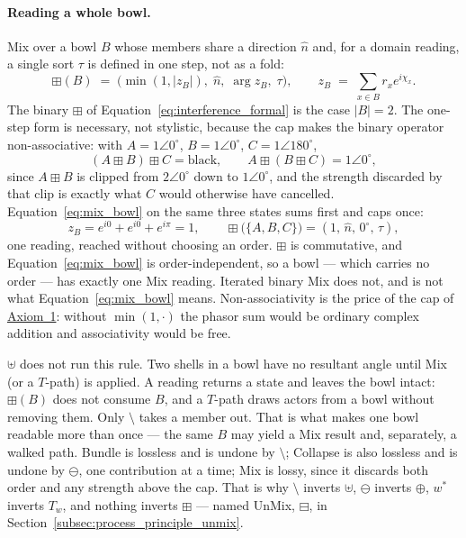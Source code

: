 \documentclass[12pt, a4paper]{article}
\begin{document}
\paragraph{Reading a whole bowl.}
Mix over a bowl $B$ whose members share a direction $\hat n$ and, for
a domain reading, a single sort $\tau$ is
defined in one step, not as a fold:
\begin{equation}
    \boxplus(B)
    \;=\;
    \bigl(\min(1,|z_B|),\;\hat n,\;\arg z_B,\;\tau\bigr),
    \qquad
    z_B \;=\; \sum_{x\in B} r_x e^{i\chi_x}.
    \label{eq:mix_bowl}
\end{equation}
The binary $\boxplus$ of Equation~\eqref{eq:interference_formal} is
the case $|B|=2$. The one-step form is necessary, not stylistic,
because the cap makes the binary operator non-associative: with
$A=1\angle 0^\circ$, $B=1\angle 0^\circ$, $C=1\angle 180^\circ$,
\[
(A\boxplus B)\boxplus C=\text{black},
\qquad
A\boxplus(B\boxplus C)=1\angle 0^\circ ,
\]
since $A\boxplus B$ is clipped from $2\angle 0^\circ$ down to
$1\angle 0^\circ$, and the strength discarded by that clip is exactly
what $C$ would otherwise have cancelled.
Equation~\eqref{eq:mix_bowl} on the same three states sums first and
caps once:
\[
z_B = e^{i0}+e^{i0}+e^{i\pi} = 1,
\qquad
\boxplus\bigl(\{A,B,C\}\bigr) = (1,\,\hat n,\,0^\circ,\,\tau),
\]
one reading, reached without choosing an order. $\boxplus$ is
commutative,
and Equation~\eqref{eq:mix_bowl} is order-independent, so a bowl ---
which carries no order --- has exactly one Mix reading. Iterated
binary Mix does not, and is not what
Equation~\eqref{eq:mix_bowl} means. Non-associativity is the price of
the cap of \hyperref[subsec:axiom1]{Axiom~1}: without $\min(1,\cdot)$ the
phasor sum would be ordinary complex addition and associativity would
be free.

$\uplus$ does not run this rule. Two shells in a bowl have no
resultant angle until Mix (or a $T$-path) is applied.
A reading returns a state and leaves the bowl intact: $\boxplus(B)$
does not consume $B$, and a $T$-path draws actors from a bowl without
removing them. Only $\setminus$ takes a member out. That is what makes
one bowl readable more than once --- the same $B$ may yield a Mix
result and, separately, a walked path.
Bundle is lossless and is undone by $\setminus$; Collapse is also
lossless and is undone by $\ominus$, one contribution at a time; Mix
is lossy, since it discards both order and any strength above the
cap. That is why $\setminus$ inverts $\uplus$, $\ominus$ inverts
$\oplus$, $w^{*}$ inverts $T_w$, and nothing inverts $\boxplus$ ---
named UnMix, $\boxminus$, in
Section~\ref{subsec:process_principle_unmix}.
\end{document}
